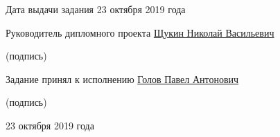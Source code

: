 \hfill \break
\noindent
Дата выдачи задания 23 октября 2019 года

\hfill \break
\noindent
Руководитель дипломного проекта \underline{\hspace{2.5cm}} \uline{Щукин Николай Васильевич}

\scriptsize \hspace{7.5cm} (подпись)

\hfill \break
\noindent
\normalsize
Задание принял к исполнению \hspace{0.9cm} \underline{\hspace{2.5cm}} \uline{Голов Павел Антонович}

\scriptsize \hspace{7.5cm} (подпись)

\hfill \break
\noindent
\normalsize
23 октября 2019 года

\normalsize
\clearpage